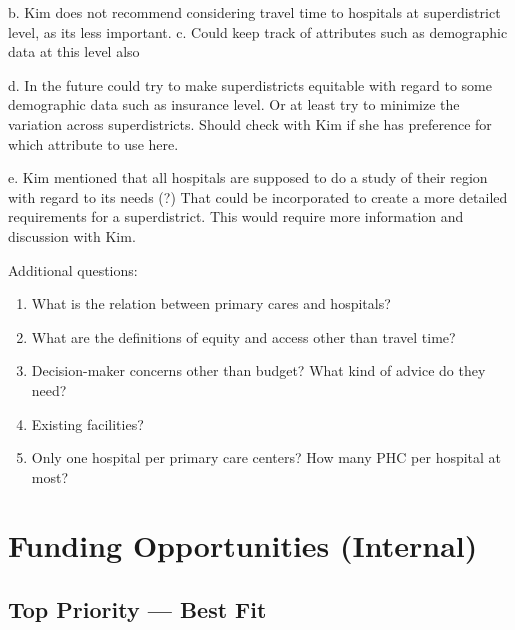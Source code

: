 \documentclass[11pt]{article}
\begin{document}
\begin{enumerate}
    \subitem b. Kim does not recommend considering travel time to hospitals at superdistrict level, as its less important.
    \subitem c. Could keep track of attributes such as demographic data at this level also

    \subitem d. In the future could try to make superdistricts equitable with regard to some demographic data such as insurance level. Or at least try to minimize the variation across superdistricts. Should check with Kim if she has preference for which attribute to use here.

    \subitem e. Kim mentioned that all hospitals are supposed to do a study of their region with regard to its needs (?) That could be incorporated to create a more detailed requirements for a superdistrict. This would require more information and discussion with Kim.
\end{enumerate}

Additional questions:
\begin{enumerate}
\item What is the relation between primary cares and hospitals?
\item What are the definitions of equity and access other than travel time?
\item Decision-maker concerns other than budget? What kind of advice do they need?
\item Existing facilities?
\item Only one hospital per primary care centers? How many PHC per hospital at most?
\end{enumerate}


\section*{Funding Opportunities (Internal)}

\subsection*{Top Priority — Best Fit}
\end{document}
